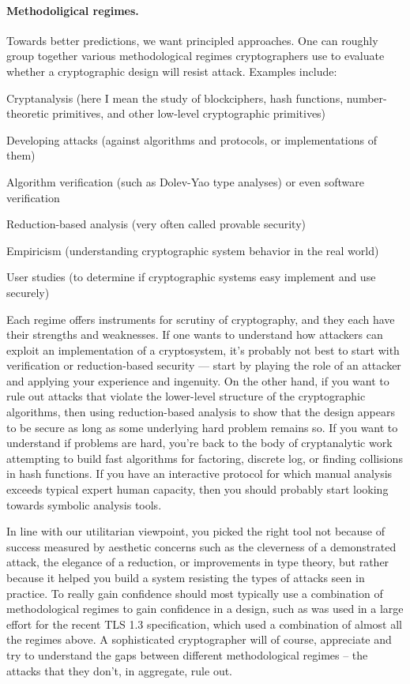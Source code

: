 \paragraph{Methodoligical regimes.} Towards better predictions, we want
principled approaches. 
One can roughly group together various methodological regimes cryptographers use
to evaluate whether a cryptographic design will resist attack.  
Examples include: 
\begin{newitemize}
\item  Cryptanalysis (here I mean the study of blockciphers, hash functions,
number-theoretic primitives, and other low-level cryptographic primitives)
\item  Developing attacks (against algorithms and protocols, or implementations of them)
\item  Algorithm verification (such as Dolev-Yao type
analyses) or even software verification
\item  Reduction-based analysis (very often called provable security)
\item  Empiricism (understanding cryptographic system behavior in the real world)
\item  User studies (to determine if cryptographic systems easy implement and use securely) 
\end{newitemize}
Each regime offers instruments for scrutiny of cryptography, and they
each have their strengths and weaknesses. If one wants to understand how
attackers can exploit an implementation of a cryptosystem, it's probably not best to start with
verification or reduction-based security --- start by playing the role of an attacker and applying your experience
and ingenuity.  On the other hand, if you want to rule out attacks that violate
the lower-level structure of the cryptographic algorithms, then using
reduction-based analysis to show that the design appears to be secure as long as
some underlying hard problem remains so. If you want to understand if problems
are hard, you're back to the body of cryptanalytic work attempting to build fast algorithms
for factoring, discrete log, or finding collisions in hash functions.
If you have an interactive protocol for which manual analysis exceeds typical expert human capacity,
then you should probably start looking towards symbolic analysis tools. 

In line with our utilitarian viewpoint, you picked the right tool not because of
success measured by aesthetic concerns such as the cleverness of a demonstrated
attack, the elegance of a reduction, or improvements in type theory, but rather
because it helped you build a system resisting the types of attacks seen in
practice. To really gain confidence should most typically use a combination of
methodological regimes to gain confidence in a design, such as was used in a
large effort for the recent TLS 1.3 specification, which used a combination of
almost all the regimes above.  A sophisticated cryptographer will of course,
appreciate and try to understand the gaps between different methodological
regimes -- the attacks that they don't, in aggregate, rule out.  


